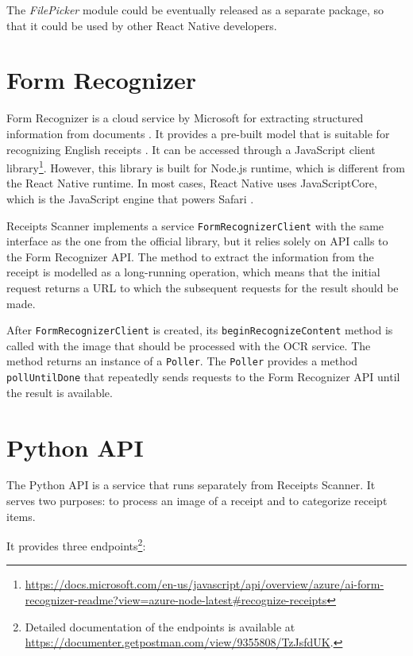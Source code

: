 \documentclass[
  digital, %
  table,   %
  oneside, %
  lof,     %
  lot,     %
]{fithesis3}
\newcommand{\definition}[1]{{#1}}
\begin{document}
The \textit{FilePicker} module could be eventually released as a separate package, so that it could be used by other React Native developers.

\section{Form Recognizer}
\label{sec:form_recognizer}
\definition{Form} Recognizer is a cloud service by Microsoft for extracting structured information from documents \cite{WhatIsFormRecognizer}. It provides a pre-built model that is suitable for recognizing English receipts \cite{FormRecognizerPrebuiltReceiptModel}. It can be accessed through a JavaScript client library\footnote{\url{https://docs.microsoft.com/en-us/javascript/api/overview/azure/ai-form-recognizer-readme?view=azure-node-latest\#recognize-receipts}}. However, this library is built for Node.js runtime, which is different from the React Native runtime. In most cases, React Native uses JavaScriptCore, which is the JavaScript engine that powers Safari \cite{JavaScriptRNEnvironment}.

Receipts Scanner implements a service \texttt{FormRecognizerClient} with the same interface as the one from the official library, but it relies solely on API calls to the Form Recognizer API. The method to extract the information from the receipt is modelled as a long-running operation, which means that the initial request returns a URL to which the subsequent requests for the result should be made.

After \texttt{FormRecognizerClient} is created, its \texttt{beginRecognizeContent} method is called with the image that should be processed with the OCR service. The method returns an instance of a \texttt{Poller}. The \texttt{Poller} provides a method \texttt{pollUntilDone} that repeatedly sends requests to the Form Recognizer API until the result is available.

\section{Python API}
\label{sec:python_api}
The Python API is a service that runs separately from Receipts Scanner. It serves two purposes: to process an image of a receipt and to categorize receipt items.

It provides three endpoints\footnote{Detailed documentation of the endpoints is available at \url{https://documenter.getpostman.com/view/9355808/TzJsfdUK}.}:
\end{document}
